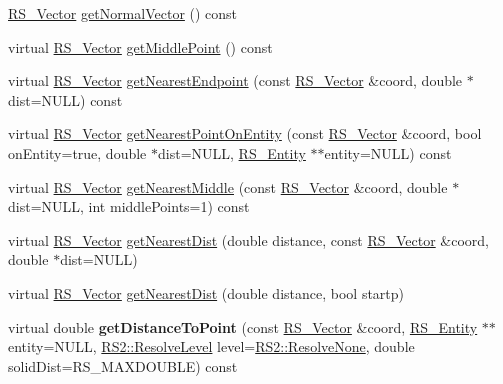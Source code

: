 \begin{DoxyCompactItemize}
\item 
\hyperlink{classRS__Vector}{R\-S\-\_\-\-Vector} \hyperlink{classRS__Line_afe87a5c971d554e8290846e756dbdcd1}{get\-Normal\-Vector} () const 
\item 
virtual \hyperlink{classRS__Vector}{R\-S\-\_\-\-Vector} \hyperlink{classRS__Line_ab4c14d9022314516b93fde10acbd2a91}{get\-Middle\-Point} () const 
\item 
virtual \hyperlink{classRS__Vector}{R\-S\-\_\-\-Vector} \hyperlink{classRS__Line_a7022a26f207df03709b9dff63cb6d6c8}{get\-Nearest\-Endpoint} (const \hyperlink{classRS__Vector}{R\-S\-\_\-\-Vector} \&coord, double $\ast$dist=N\-U\-L\-L) const 
\item 
virtual \hyperlink{classRS__Vector}{R\-S\-\_\-\-Vector} \hyperlink{classRS__Line_a761fd0307817279bc8c534edcfb54ae1}{get\-Nearest\-Point\-On\-Entity} (const \hyperlink{classRS__Vector}{R\-S\-\_\-\-Vector} \&coord, bool on\-Entity=true, double $\ast$dist=N\-U\-L\-L, \hyperlink{classRS__Entity}{R\-S\-\_\-\-Entity} $\ast$$\ast$entity=N\-U\-L\-L) const 
\item 
virtual \hyperlink{classRS__Vector}{R\-S\-\_\-\-Vector} \hyperlink{classRS__Line_a6757ab288a55f5dcb7192e74095a219f}{get\-Nearest\-Middle} (const \hyperlink{classRS__Vector}{R\-S\-\_\-\-Vector} \&coord, double $\ast$dist=N\-U\-L\-L, int middle\-Points=1) const 
\item 
virtual \hyperlink{classRS__Vector}{R\-S\-\_\-\-Vector} \hyperlink{classRS__Line_a5112be6fdab77beaa1e23d2d88cc2360}{get\-Nearest\-Dist} (double distance, const \hyperlink{classRS__Vector}{R\-S\-\_\-\-Vector} \&coord, double $\ast$dist=N\-U\-L\-L)
\item 
virtual \hyperlink{classRS__Vector}{R\-S\-\_\-\-Vector} \hyperlink{classRS__Line_a424ddf8a98ed8d458bf50217273aec0e}{get\-Nearest\-Dist} (double distance, bool startp)
\item 
\hypertarget{classRS__Line_acb3e92c4bd740932368ef5fe7552d24e}{virtual double {\bfseries get\-Distance\-To\-Point} (const \hyperlink{classRS__Vector}{R\-S\-\_\-\-Vector} \&coord, \hyperlink{classRS__Entity}{R\-S\-\_\-\-Entity} $\ast$$\ast$entity=N\-U\-L\-L, \hyperlink{classRS2_a1b2c5e3a3e9d1b03a9564229255faa20}{R\-S2\-::\-Resolve\-Level} level=\hyperlink{classRS2_a1b2c5e3a3e9d1b03a9564229255faa20aecb7396f39bc313ad8903c8a5fac5a50}{R\-S2\-::\-Resolve\-None}, double solid\-Dist=R\-S\-\_\-\-M\-A\-X\-D\-O\-U\-B\-L\-E) const }\label{classRS__Line_acb3e92c4bd740932368ef5fe7552d24e}


\end{DoxyCompactItemize}
